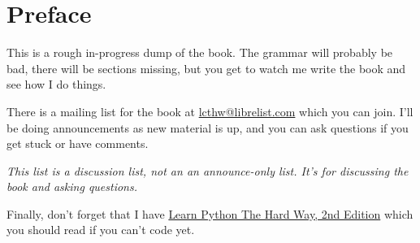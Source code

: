 \chapter*{Preface}

This is a rough in-progress dump of the book.  The grammar will probably be bad, there
will be sections missing, but you get to watch me write the book and see how I do things.

There is a mailing list for the book at
\href{mailto:lcthw@librelist.com}{lcthw@librelist.com} which you can join.
I'll be doing announcements as new material is up, and you can ask questions if
you get stuck or have comments. 

\emph{This list is a discussion list, not an an announce-only list.  It's for discussing the book and asking questions.}

Finally, don't forget that I have \href{http://learnpythonthehardway.org}{Learn
Python The Hard Way, 2nd Edition} which you should read if you can't code yet.


